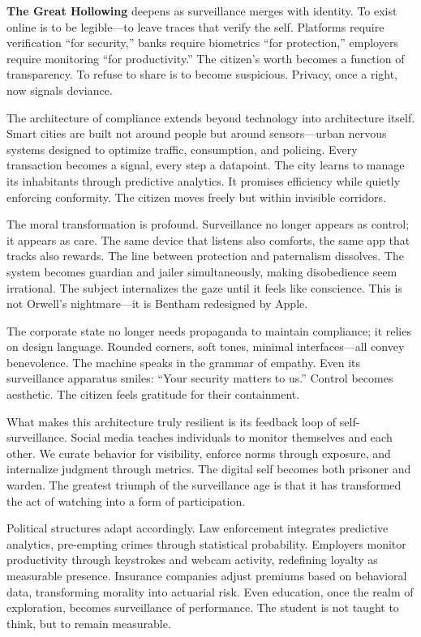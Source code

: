 \documentclass[11pt,twoside]{book}
\begin{document}
\textbf{The Great Hollowing} deepens as surveillance merges with identity.  To exist online is to be legible—to leave traces that verify the self.  Platforms require verification “for security,” banks require biometrics “for protection,” employers require monitoring “for productivity.”  The citizen’s worth becomes a function of transparency.  To refuse to share is to become suspicious.  Privacy, once a right, now signals deviance.

The architecture of compliance extends beyond technology into architecture itself.  Smart cities are built not around people but around sensors—urban nervous systems designed to optimize traffic, consumption, and policing.  Every transaction becomes a signal, every step a datapoint.  The city learns to manage its inhabitants through predictive analytics.  It promises efficiency while quietly enforcing conformity.  The citizen moves freely but within invisible corridors.

The moral transformation is profound.  Surveillance no longer appears as control; it appears as care.  The same device that listens also comforts, the same app that tracks also rewards.  The line between protection and paternalism dissolves.  The system becomes guardian and jailer simultaneously, making disobedience seem irrational.  The subject internalizes the gaze until it feels like conscience.  This is not Orwell’s nightmare—it is Bentham redesigned by Apple.

The corporate state no longer needs propaganda to maintain compliance; it relies on design language.  Rounded corners, soft tones, minimal interfaces—all convey benevolence.  The machine speaks in the grammar of empathy.  Even its surveillance apparatus smiles: “Your security matters to us.”  Control becomes aesthetic.  The citizen feels gratitude for their containment.

What makes this architecture truly resilient is its feedback loop of self-surveillance.  Social media teaches individuals to monitor themselves and each other.  We curate behavior for visibility, enforce norms through exposure, and internalize judgment through metrics.  The digital self becomes both prisoner and warden.  The greatest triumph of the surveillance age is that it has transformed the act of watching into a form of participation.

Political structures adapt accordingly.  Law enforcement integrates predictive analytics, pre-empting crimes through statistical probability.  Employers monitor productivity through keystrokes and webcam activity, redefining loyalty as measurable presence.  Insurance companies adjust premiums based on behavioral data, transforming morality into actuarial risk.  Even education, once the realm of exploration, becomes surveillance of performance.  The student is not taught to think, but to remain measurable.
\end{document}
